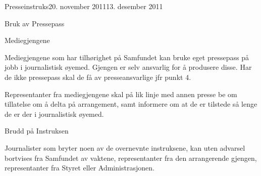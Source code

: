\begin{instruks}{Presseinstruks}{20. november 2011}{13. desember 2011}
\begin{instruksledd}{Bruk av Pressepass}
    \end{instruksledd}


    \begin{instruksledd}{Mediegjengene}

Mediegjengene som har tilhørighet på Samfundet kan bruke eget pressepass på jobb i journalistisk øyemed. Gjengen er selv ansvarlig for å produsere disse. Har de ikke pressepass skal de få av presseansvarlige jfr punkt 4.


Representanter fra mediegjengene skal på lik linje med annen presse be om tillatelse om å delta på arrangement, samt informere om at de er tilstede så lenge de er der i journalistisk øyemed.

    \end{instruksledd}

  \begin{instruksledd}{Brudd på Instruksen}

Journalister som bryter noen av de overnevnte instruksene, kan uten advarsel bortvises fra Samfundet av vaktene, representanter fra den arrangerende gjengen, representanter fra Styret eller Administrasjonen.

\end{instruksledd}

\end{instruks}
